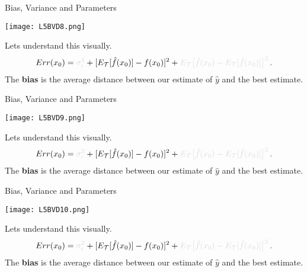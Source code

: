 \documentclass[10pt, table, dvipsnames,handout]{beamer}
\newcommand{\cT}{\ensuremath{\mathcal{T}}}
\begin{document}
\begin{frame}[fragile]{Bias, Variance and Parameters}
  \begin{minipage}[t][0.6\textheight][t]{\textwidth}
	  \centering \texttt{[image: L5BVD8.png]}
  \end{minipage}
  \vfill
  \begin{minipage}[t][0.4\textheight][t]{\textwidth}
Lets understand this visually.
$$
Err(x_0) = {\color{gray!30}\sigma_\epsilon^2} + [E_\cT[\hat f(x_0)] - f(x_0)]^2 + {\color{gray!30}E_\cT\big[ \hat{f}(x_0) - E_\cT[\hat{f}(x_0)] \big]^2}\,.
$$
The \textbf{bias} is the average distance between our estimate of $\hat{y}$ and the best estimate. 
\end{minipage}
\end{frame}



\begin{frame}[fragile]{Bias, Variance and Parameters}
  \begin{minipage}[t][0.6\textheight][t]{\textwidth}
	  \centering \texttt{[image: L5BVD9.png]}
  \end{minipage}
  \vfill
  \begin{minipage}[t][0.4\textheight][t]{\textwidth}
Lets understand this visually.
$$
Err(x_0) = {\color{gray!30}\sigma_\epsilon^2} + [E_\cT[\hat f(x_0)] - f(x_0)]^2 + {\color{gray!30}E_\cT\big[ \hat{f}(x_0) - E_\cT[\hat{f}(x_0)] \big]^2}\,.
$$
The \textbf{bias} is the average distance between our estimate of $\hat{y}$ and the best estimate. 
\end{minipage}
\end{frame}


\begin{frame}[fragile]{Bias, Variance and Parameters}
  \begin{minipage}[t][0.6\textheight][t]{\textwidth}
	  \centering \texttt{[image: L5BVD10.png]}
  \end{minipage}
  \vfill
  \begin{minipage}[t][0.4\textheight][t]{\textwidth}
Lets understand this visually.
$$
Err(x_0) = {\color{gray!30}\sigma_\epsilon^2} + [E_\cT[\hat f(x_0)] - f(x_0)]^2 + {\color{gray!30}E_\cT\big[ \hat{f}(x_0) - E_\cT[\hat{f}(x_0)] \big]^2}\,.
$$
The \textbf{bias} is the average distance between our estimate of $\hat{y}$ and the best estimate. 
\end{minipage}
\end{frame}
\end{document}
